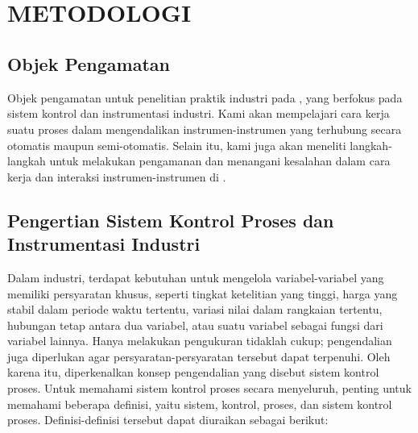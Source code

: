 \chapter[METODOLOGI]{\\ METODOLOGI}

\section{Objek Pengamatan}

Objek pengamatan untuk penelitian praktik industri pada {\perusahaan}, yang berfokus pada sistem kontrol dan instrumentasi industri. Kami akan mempelajari cara kerja suatu proses dalam mengendalikan instrumen-instrumen yang terhubung secara otomatis maupun semi-otomatis. Selain itu, kami juga akan meneliti langkah-langkah untuk melakukan pengamanan dan menangani kesalahan dalam cara kerja dan interaksi instrumen-instrumen di {\perusahaan}.

\section{Pengertian Sistem Kontrol Proses dan Instrumentasi Industri}

Dalam industri, terdapat kebutuhan untuk mengelola variabel-variabel yang memiliki persyaratan khusus, seperti tingkat ketelitian yang tinggi, harga yang stabil dalam periode waktu tertentu, variasi nilai dalam rangkaian tertentu, hubungan tetap antara dua variabel, atau suatu variabel sebagai fungsi dari variabel lainnya. Hanya melakukan pengukuran tidaklah cukup; pengendalian juga diperlukan agar persyaratan-persyaratan tersebut dapat terpenuhi. Oleh karena itu, diperkenalkan konsep pengendalian yang disebut sistem kontrol proses. Untuk memahami sistem kontrol proses secara menyeluruh, penting untuk memahami beberapa definisi, yaitu sistem, kontrol, proses, dan sistem kontrol proses. Definisi-definisi tersebut dapat diuraikan sebagai berikut:

